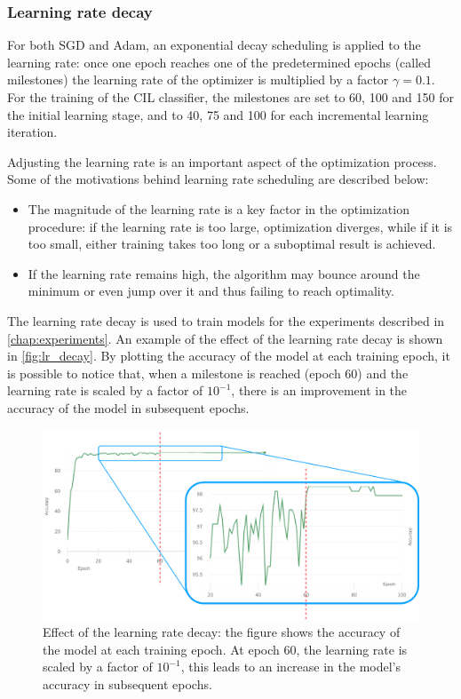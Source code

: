 \subsubsection{Learning rate decay}
For both SGD and Adam, an exponential decay scheduling is applied to the learning rate: once one epoch reaches one of the predetermined epochs (called milestones) the learning rate of the optimizer is multiplied by a factor $\gamma = 0.1$. For the training of the CIL classifier, the milestones are set to 60, 100 and 150 for the initial learning stage, and to 40, 75 and 100 for each incremental learning iteration.

Adjusting the learning rate is an important aspect of the optimization process. Some of the motivations behind learning rate scheduling are described below:
\begin{itemize}
    \item The magnitude of the learning rate is a key factor in the optimization procedure: if the learning rate is too large, optimization diverges, while if it is too small, either training takes too long or a suboptimal result is achieved.
    \item If the learning rate remains high, the algorithm may bounce around the minimum or even jump over it and thus failing to reach optimality. 
\end{itemize}

The learning rate decay is used to train models for the experiments described in \autoref{chap:experiments}. An example of the effect of the learning rate decay is shown in \autoref{fig:lr_decay}.
By plotting the accuracy of the model at each training epoch, it is possible to notice that, when a milestone is reached (epoch 60) and the learning rate is scaled by a factor of $10^{-1}$, there is an improvement in the accuracy of the model in subsequent epochs.

\begin{figure}[H]
	\centering

    \begin{center}
        \includegraphics[width=\columnwidth]{images/lr_decay.drawio.png}
    \end{center}

	\caption{Effect of the learning rate decay: the figure shows the accuracy of the model at each training epoch. At epoch 60, the learning rate is scaled by a factor of $10^{-1}$, this leads to an increase in the model's accuracy in subsequent epochs.}
	\label{fig:lr_decay}%
\end{figure}


